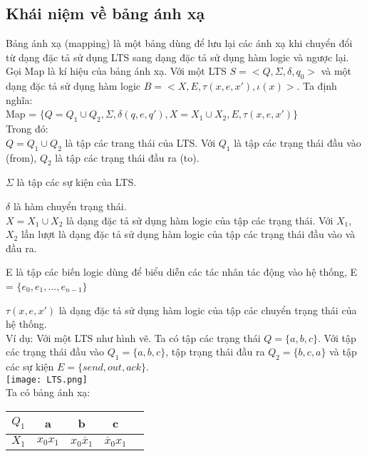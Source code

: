 \documentclass{article}
\begin{document}
\begin{flushleft}
		\subsection{Khái niệm về bảng ánh xạ}
			Bảng ánh xạ (mapping) là một bảng dùng để lưu lại các ánh xạ khi chuyển đổi từ dạng đặc tả sử dụng LTS sang dạng đặc tả sử dụng hàm logic và ngược lại.\\
			Gọi Map là kí hiệu của bảng ánh xạ. Với một LTS $S = <Q, \Sigma, \delta, q_{0}>$ và một dạng đặc tả sử dụng hàm logic $B = <X, E, \tau(x, e, x'), \iota(x)>$. Ta định nghĩa:\\
			Map = $\{Q = Q_1 \cup Q_2, \Sigma, \delta(q, e, q'), X = X_1 \cup X_2, E, \tau(x, e, x')\}$\\
			Trong đó:\\
			$Q = Q_1 \cup Q_2$ là tập các trang thái của LTS. Với $Q_1$ là tập các trạng thái đầu vào (from), $Q_2$ là tập các trạng thái đầu ra (to).\\
			\item $\Sigma$ là tập các sự kiện của LTS.\\
			\item $\delta$ là hàm chuyển trạng thái.\\
			$X = X_1 \cup X_2$ là dạng đặc tả sử dụng hàm logic của tập các trạng thái. Với $X_1$, $X_2$ lần lượt là dạng đặc tả sử dụng hàm logic của tập các trạng thái đầu vào và đầu ra.\\
			\item E là tập các biến logic dùng để biểu diễn các tác nhân tác động vào hệ thống, E = $\{e_0, e_1, ..., e_{n-1}\}$
			\item $\tau(x, e, x')$ là dạng đặc tả sử dụng hàm logic của tập các chuyển trạng thái của hệ thống.\\
			Ví dụ: Với một LTS như hình vẽ. Ta có tập các trạng thái $Q = \{a, b, c\}$. Với tập các trạng thái đầu vào $Q_{1} = \{a, b, c\}$, tập trạng thái đầu ra $Q_{2} = \{b, c, a\}$ và tập các sự kiện $E = \{send, out, ack\}$.\\
			\texttt{[image: LTS.png]}\\
			Ta có bảng ánh xạ:
			\begin{table}[!ht]
				\centering
				\renewcommand{\arraystretch}{1.25}
				\begin{tabular}{|c|c|c|c|c|}
					\hline
					$Q_1$ & a & b & c\\
					\hline
					$X_1$ & $x_0x_1$ & $x_0\overline x_1$& $\overline x_0x_1$\\
					\hline
				\end{tabular}

\end{table}
\end{flushleft}
\end{document}
